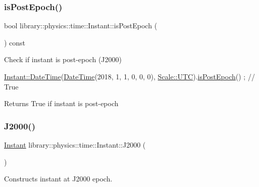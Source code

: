 \subsubsection{\texorpdfstring{is\+Post\+Epoch()}{isPostEpoch()}}
{\footnotesize\ttfamily bool library\+::physics\+::time\+::\+Instant\+::is\+Post\+Epoch (\begin{DoxyParamCaption}{ }\end{DoxyParamCaption}) const}



Check if instant is post-\/epoch (J2000) 


\begin{DoxyCode}
\hyperlink{classlibrary_1_1physics_1_1time_1_1_instant_ac827b6ffa57ce75a3c56c462d4c872f8}{Instant::DateTime}(\hyperlink{classlibrary_1_1physics_1_1time_1_1_instant_ac827b6ffa57ce75a3c56c462d4c872f8}{DateTime}(2018, 1, 1, 0, 0, 0), 
      \hyperlink{namespacelibrary_1_1physics_1_1time_a09d2bc9fbc7b0b5f92e1419bd655e6bba9234324ddf6b4176b57d803a925b7961}{Scale::UTC}).\hyperlink{classlibrary_1_1physics_1_1time_1_1_instant_a649a2505c26b68b17ed7a80429b599ee}{isPostEpoch}() ; \textcolor{comment}{// True}
\end{DoxyCode}


\begin{DoxyReturn}{Returns}
True if instant is post-\/epoch 
\end{DoxyReturn}
\mbox{\label{classlibrary_1_1physics_1_1time_1_1_instant_a2a4f57aa71693b8def06788d55bc3bd3}} 
\subsubsection{\texorpdfstring{J2000()}{J2000()}}
{\footnotesize\ttfamily \hyperlink{classlibrary_1_1physics_1_1time_1_1_instant}{Instant} library\+::physics\+::time\+::\+Instant\+::\+J2000 (\begin{DoxyParamCaption}{ }\end{DoxyParamCaption})\hspace{0.3cm}{\ttfamily [static]}}



Constructs instant at J2000 epoch. 

